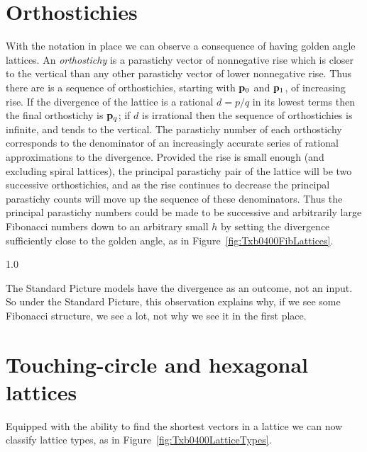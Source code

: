 \clearpage


\section{Orthostichies}
With the notation in place we can observe a consequence of having golden angle lattices. An \textit{orthostichy} is a parastichy vector of nonnegative rise which is closer to the vertical than any other parastichy vector of lower nonnegative rise.%
 Thus there are is a sequence of orthostichies,  starting with ${\mathbf p}_{0}$ and ${\mathbf p}_{1}$, of increasing rise. If the divergence of the lattice is a rational $d=p/q$ in its lowest terms then the final orthostichy is ${\mathbf p}_{q}$; if $d$ is irrational then the sequence of orthostichies is infinite, and tends to the vertical. The parastichy number of each orthostichy corresponds to the denominator of an increasingly accurate series of rational approximations to the divergence. Provided the rise is small enough (and excluding spiral lattices), the principal parastichy pair of the lattice will be two successive orthostichies,
and as the rise continues to decrease the principal parastichy counts will move up the sequence of these denominators. Thus the principal parastichy numbers could be made to be successive and arbitrarily large Fibonacci numbers down to an arbitrary small $h$ by setting the divergence sufficiently close to the golden angle, as in Figure~\ref{fig:Txb0400FibLattices}.

{1.0}

The Standard Picture models have the divergence as an outcome, not an input. So under the Standard Picture, this observation explains why, if we see some Fibonacci structure, we see a lot, not why we see it in the first place. 
\clearpage


\section{Touching-circle and hexagonal lattices}
\label{sec:hexdef}
Equipped with the ability to find the shortest vectors in a lattice we can now classify lattice types, as in Figure~\ref{fig:Txb0400LatticeTypes}.

